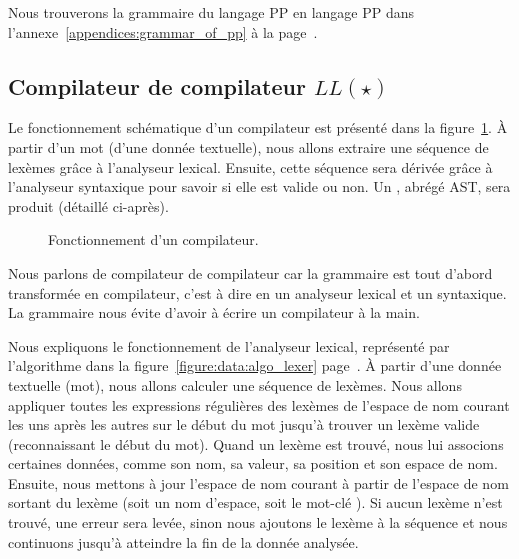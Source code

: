 Nous trouverons la grammaire du langage PP en langage PP dans
l'annexe~\ref{appendices:grammar_of_pp} à la
page~\pageref{appendices:grammar_of_pp}.

\subsection{Compilateur de compilateur $LL(\star)$}
\label{subsection:data:compiler-compiler}

Le fonctionnement schématique d'un compilateur est présenté dans la
figure~\ref{figure:data:compiler}. À partir d'un {\strong mot} (d'une donnée
textuelle), nous allons extraire une {\strong séquence} de lexèmes grâce à
l'analyseur {\strong lexical}. Ensuite, cette séquence sera {\strong dérivée}
grâce à l'analyseur {\strong syntaxique} pour savoir si elle est valide ou non.
Un , abrégé AST, sera produit (détaillé
ci-après).
%
\begin{figure}


\caption{\label{figure:data:compiler} Fonctionnement d'un compilateur.}

\end{figure}
%
Nous parlons de {\strong compilateur de compilateur} car la grammaire est tout
d'abord transformée en compilateur, c'est à dire en un analyseur lexical et un
syntaxique. La grammaire nous évite d'avoir à écrire un compilateur à la main.

Nous expliquons le fonctionnement de l'analyseur lexical, représenté par
l'algorithme dans la figure~\ref{figure:data:algo_lexer}
page~\pageref{figure:data:algo_lexer}. À partir d'une donnée
textuelle (mot), nous allons calculer une séquence de lexèmes. Nous allons
appliquer toutes les expressions régulières des lexèmes de l'espace de nom
courant les uns après les autres sur le début du mot jusqu'à trouver un lexème
valide (reconnaissant le début du mot). Quand un lexème est trouvé, nous lui
associons certaines données, comme son nom, sa valeur, sa position et son espace
de nom. Ensuite, nous mettons à jour l'espace de nom courant à partir de
l'espace de nom sortant du lexème (soit un nom d'espace, soit le mot-clé
). Si aucun lexème n'est trouvé, une erreur sera
levée, sinon nous ajoutons le lexème à la séquence et nous continuons jusqu'à
atteindre la fin de la donnée analysée.

